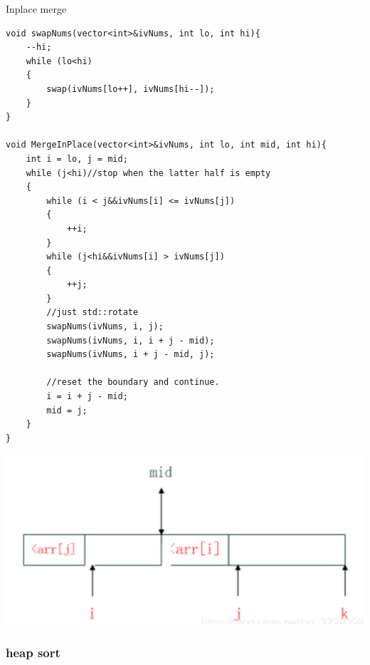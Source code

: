 \documentclass[a4paper,11pt,twoside]{book}
\begin{document}
	\par Inplace merge
\begin{lstlisting}
void swapNums(vector<int>&ivNums, int lo, int hi){
	--hi;
	while (lo<hi)
	{
		swap(ivNums[lo++], ivNums[hi--]);
	}
}

void MergeInPlace(vector<int>&ivNums, int lo, int mid, int hi){
	int i = lo, j = mid;
	while (j<hi)//stop when the latter half is empty
	{
		while (i < j&&ivNums[i] <= ivNums[j])
		{
			++i;
		}
		while (j<hi&&ivNums[i] > ivNums[j])
		{
			++j;
		}
		//just std::rotate
		swapNums(ivNums, i, j);
		swapNums(ivNums, i, i + j - mid);
		swapNums(ivNums, i + j - mid, j);
		
		//reset the boundary and continue.
		i = i + j - mid;
		mid = j;
	}
}
\end{lstlisting}

\begin{center}
	\includegraphics[scale=0.45]{pics/inplace}
\end{center}

\subsubsection{heap sort}
\end{document}
